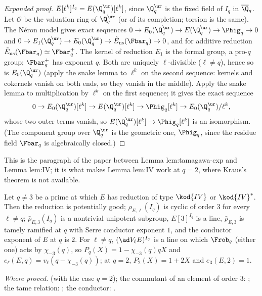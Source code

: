 \begin{sloppypar}
\begin{proof}[Expanded proof]
$E[\ell^k]^{I_q}=E(\Q_q^{\ur})[\ell^k]$, since $\Q_q^{\ur}$ is the fixed field of $I_q$ in $\overline\Q_q$. Let $\mathcal O$ be the valuation ring of $\Q_q^{\ur}$ (or of its completion; torsion is the same). The N\'eron model gives exact sequences
$0\to E_0(\Q_q^{\ur})\to E(\Q_q^{\ur})\to\Phig_q\to0$ and $0\to E_1(\Q_q^{\ur})\to E_0(\Q_q^{\ur})\to\tilde E_{\mathrm{ns}}(\Fbar_q)\to0$, and for additive reduction
$\tilde E_{\mathrm{ns}}(\Fbar_q)\simeq\Fbar_q^+$. The kernel of reduction $E_1$ is the formal group, a pro-$q$ group; $\Fbar_q^+$ has exponent $q$. Both are uniquely $\ell$-divisible ($\ell\ne q$),
hence so is $E_0(\Q_q^{\ur})$ (apply the snake lemma to $\ell^k$ on the second sequence: kernels and cokernels vanish on both ends, so they vanish in the middle). Apply the snake
lemma to multiplication by $\ell^k$ on the first sequence; it gives the exact sequence
\[
0\to E_0(\Q_q^{\ur})[\ell^k]\to E(\Q_q^{\ur})[\ell^k]\to\Phig_q[\ell^k]\to E_0(\Q_q^{\ur})/\ell^k,
\]
whose two outer terms vanish, so $E(\Q_q^{\ur})[\ell^k]\to\Phig_q[\ell^k]$ is an isomorphism. (The component group over $\Q_q^{\ur}$ is the geometric one, $\Phig_q$, since the residue field
$\Fbar_q$ is algebraically closed.)
\end{proof}

\noindent This is the paragraph of the paper between Lemma lem:tamagawa-exp and Lemma lem:IV; it is what makes Lemma lem:IV work at $q=2$, where Kraus's theorem is
not available.

\begin{lemma}\label{lem:paper:IV}
Let $q\ne3$ be a prime at which $E$ has reduction of type $\kod{IV}$ or $\kod{IV}^*$. Then the reduction is potentially good; $\rho_{E,\ell}(I_q)$ is cyclic of order $3$ for every
$\ell\ne q$; $\bar\rho_{E,3}(I_q)$ is a nontrivial unipotent subgroup, $E[3]^{I_q}$ is a line, $\bar\rho_{E,3}$ is tamely ramified at $q$ with Serre conductor exponent $1$, and
the conductor exponent of $E$ at $q$ is $2$. For $\ell\ne q$, $(\ad V_\ell E)^{I_q}$ is a line on which $\Frob_q$ (either one) acts by $\chi_{-3}(q)$, so $P_q(X)=1-\chi_{-3}(q)qX$ and
$e_\ell(E,q)=v_\ell(q-\chi_{-3}(q))$; at $q=2$, $P_2(X)=1+2X$ and $e_3(E,2)=1$.
\end{lemma}

\noindent\emph{Where proved.}  (with the case $q=2$); the commutant of an element of order $3$: ; the tame relation: ; the
conductor: .


\end{sloppypar}
